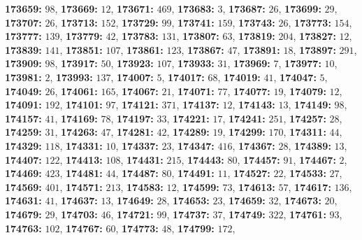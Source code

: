 \textsf{\bfseries 173659:} $98$, \textsf{\bfseries 173669:} $12$, \textsf{\bfseries 173671:} $469$, \textsf{\bfseries 173683:} $3$, \textsf{\bfseries 173687:} $26$, \textsf{\bfseries 173699:} $29$, \textsf{\bfseries 173707:} $26$, \textsf{\bfseries 173713:} $152$, \textsf{\bfseries 173729:} $99$, \textsf{\bfseries 173741:} $159$, \textsf{\bfseries 173743:} $26$, \textsf{\bfseries 173773:} $154$, \textsf{\bfseries 173777:} $139$, \textsf{\bfseries 173779:} $42$, \textsf{\bfseries 173783:} $131$, \textsf{\bfseries 173807:} $63$, \textsf{\bfseries 173819:} $204$, \textsf{\bfseries 173827:} $12$, \textsf{\bfseries 173839:} $141$, \textsf{\bfseries 173851:} $107$, \textsf{\bfseries 173861:} $123$, \textsf{\bfseries 173867:} $47$, \textsf{\bfseries 173891:} $18$, \textsf{\bfseries 173897:} $291$, \textsf{\bfseries 173909:} $98$, \textsf{\bfseries 173917:} $50$, \textsf{\bfseries 173923:} $107$, \textsf{\bfseries 173933:} $31$, \textsf{\bfseries 173969:} $7$, \textsf{\bfseries 173977:} $10$, \textsf{\bfseries 173981:} $2$, \textsf{\bfseries 173993:} $137$, \textsf{\bfseries 174007:} $5$, \textsf{\bfseries 174017:} $68$, \textsf{\bfseries 174019:} $41$, \textsf{\bfseries 174047:} $5$, \textsf{\bfseries 174049:} $26$, \textsf{\bfseries 174061:} $165$, \textsf{\bfseries 174067:} $21$, \textsf{\bfseries 174071:} $77$, \textsf{\bfseries 174077:} $19$, \textsf{\bfseries 174079:} $12$, \textsf{\bfseries 174091:} $192$, \textsf{\bfseries 174101:} $97$, \textsf{\bfseries 174121:} $371$, \textsf{\bfseries 174137:} $12$, \textsf{\bfseries 174143:} $13$, \textsf{\bfseries 174149:} $98$, \textsf{\bfseries 174157:} $41$, \textsf{\bfseries 174169:} $78$, \textsf{\bfseries 174197:} $33$, \textsf{\bfseries 174221:} $17$, \textsf{\bfseries 174241:} $251$, \textsf{\bfseries 174257:} $28$, \textsf{\bfseries 174259:} $31$, \textsf{\bfseries 174263:} $47$, \textsf{\bfseries 174281:} $42$, \textsf{\bfseries 174289:} $19$, \textsf{\bfseries 174299:} $170$, \textsf{\bfseries 174311:} $44$, \textsf{\bfseries 174329:} $118$, \textsf{\bfseries 174331:} $10$, \textsf{\bfseries 174337:} $23$, \textsf{\bfseries 174347:} $416$, \textsf{\bfseries 174367:} $28$, \textsf{\bfseries 174389:} $13$, \textsf{\bfseries 174407:} $122$, \textsf{\bfseries 174413:} $108$, \textsf{\bfseries 174431:} $215$, \textsf{\bfseries 174443:} $80$, \textsf{\bfseries 174457:} $91$, \textsf{\bfseries 174467:} $2$, \textsf{\bfseries 174469:} $423$, \textsf{\bfseries 174481:} $44$, \textsf{\bfseries 174487:} $80$, \textsf{\bfseries 174491:} $11$, \textsf{\bfseries 174527:} $22$, \textsf{\bfseries 174533:} $27$, \textsf{\bfseries 174569:} $401$, \textsf{\bfseries 174571:} $213$, \textsf{\bfseries 174583:} $12$, \textsf{\bfseries 174599:} $73$, \textsf{\bfseries 174613:} $57$, \textsf{\bfseries 174617:} $136$, \textsf{\bfseries 174631:} $41$, \textsf{\bfseries 174637:} $13$, \textsf{\bfseries 174649:} $28$, \textsf{\bfseries 174653:} $23$, \textsf{\bfseries 174659:} $32$, \textsf{\bfseries 174673:} $20$, \textsf{\bfseries 174679:} $29$, \textsf{\bfseries 174703:} $46$, \textsf{\bfseries 174721:} $99$, \textsf{\bfseries 174737:} $37$, \textsf{\bfseries 174749:} $322$, \textsf{\bfseries 174761:} $93$, \textsf{\bfseries 174763:} $102$, \textsf{\bfseries 174767:} $60$, \textsf{\bfseries 174773:} $48$, \textsf{\bfseries 174799:} $172$, 
